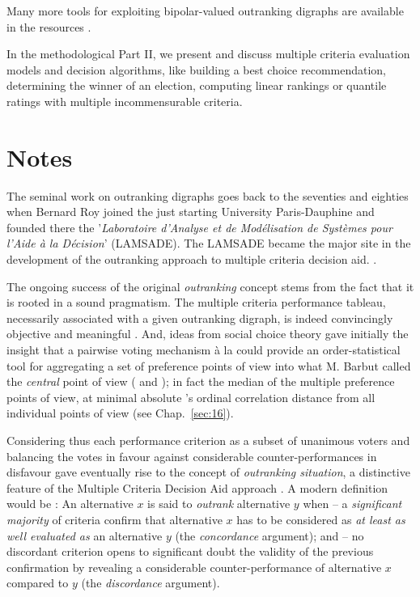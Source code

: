 Many more tools for exploiting bipolar-valued outranking digraphs are available in the \Digraph resources \citep{BIS-2021b}.
\vspace{1cm}

In the methodological Part II, we present and discuss multiple criteria evaluation models and decision algorithms, like building a best choice recommendation, determining the winner of an election, computing linear rankings or quantile ratings with multiple incommensurable criteria.

{}
\section*{Notes}

The seminal work on outranking digraphs goes back to the seventies and eighties when Bernard Roy  joined the just starting University Paris-Dauphine and founded there the '\emph{Laboratoire d’Analyse et de Modélisation de Systèmes pour l’Aide à la Décision}' (LAMSADE). The LAMSADE became the major site in the development of the outranking approach to multiple criteria decision aid. \citep*{ROY-1993}.

The ongoing success of the original \emph{outranking} concept stems from the fact that it is rooted in a sound pragmatism. The multiple criteria performance tableau, necessarily associated with a given outranking digraph, is indeed convincingly objective and meaningful \citep{ROY-1991}. And, ideas from social choice theory gave initially the insight that a pairwise voting mechanism à la \Condorcet could provide an order-statistical tool for aggregating a set of preference points of view into what M. Barbut called the \emph{central} \Condorcet point of view (\citealp{CON-1784} and \citealp{BAR-1980}); in fact the median of the multiple preference points of view, at minimal absolute \Kendall's ordinal correlation distance from all individual points of view (see Chap.~\ref{sec:16}).

Considering thus each performance criterion as a subset of unanimous voters and balancing the votes in favour against considerable counter-performances in disfavour gave eventually rise to the concept of \emph{outranking situation}, a distinctive feature of the Multiple Criteria Decision Aid approach \citep{BIS-2015}.  A modern definition would be : An alternative $x$ is said to \emph{outrank} alternative $y$ when – a \emph{significant majority} of criteria confirm that alternative $x$ has to be considered as \emph{at least as well evaluated as} an alternative $y$ (the \emph{concordance} argument); and – no discordant criterion opens to significant doubt the validity of the previous confirmation by revealing a considerable counter-performance of alternative $x$ compared to $y$ (the \emph{discordance} argument).

